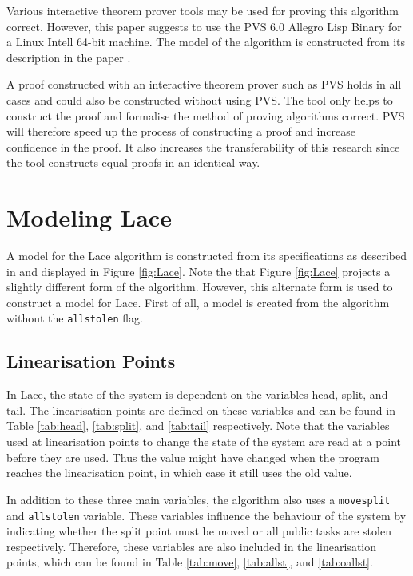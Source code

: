 \documentclass{sig-alternate-br}
\begin{document}
Various interactive theorem prover tools may be used for proving this algorithm correct.
However, this paper suggests to use the PVS 6.0 Allegro Lisp Binary for a Linux Intell 64-bit machine.
The model of the algorithm is constructed from its description in the paper \cite{vanDijk2014206}.

A proof constructed with an interactive theorem prover such as PVS holds in all cases and could also be constructed without using PVS.
The tool only helps to construct the proof and formalise the method of proving algorithms correct.
PVS will therefore speed up the process of constructing a proof and increase confidence in the proof.
It also increases the transferability of this research since the tool constructs equal proofs in an identical way.

\section{Modeling Lace}
A model for the Lace algorithm is constructed from its specifications as described in \cite{vanDijk2014206} and displayed in Figure \ref{fig:Lace}.
Note the that Figure \ref{fig:Lace} projects a slightly different form of the algorithm.
However, this alternate form is used to construct a model for Lace.
First of all, a model is created from the algorithm without the \texttt{allstolen} flag.

\subsection{Linearisation Points}
In Lace, the state of the system is dependent on the variables head, split, and tail.
The linearisation points are defined on these variables and can be found in Table \ref{tab:head}, \ref{tab:split}, and \ref{tab:tail} respectively.
Note that the variables used at linearisation points to change the state of the system are read at a point before they are used.
Thus the value might have changed when the program reaches the linearisation point, in which case it still uses the old value.

In addition to these three main variables, the algorithm also uses a \texttt{movesplit} and \texttt{allstolen} variable.
These variables influence the behaviour of the system by indicating whether the split point must be moved or all public tasks are stolen respectively.
Therefore, these variables are also included in the linearisation points, which can be found in Table \ref{tab:move}, \ref{tab:allst}, and \ref{tab:oallst}.
\end{document}
